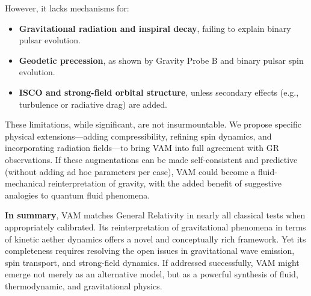 However, it lacks mechanisms for:

\begin{itemize}
    \item \textbf{Gravitational radiation and inspiral decay}, failing to explain binary pulsar evolution.
    \item \textbf{Geodetic precession}, as shown by Gravity Probe B and binary pulsar spin evolution.
    \item \textbf{ISCO and strong-field orbital structure}, unless secondary effects (e.g., turbulence or radiative drag) are added.
\end{itemize}

These limitations, while significant, are not insurmountable. We propose specific physical extensions—adding compressibility, refining spin dynamics, and incorporating radiation fields—to bring VAM into full agreement with GR observations. If these augmentations can be made self-consistent and predictive (without adding ad hoc parameters per case), VAM could become a fluid-mechanical reinterpretation of gravity, with the added benefit of suggestive analogies to quantum fluid phenomena.

\textbf{In summary}, VAM matches General Relativity in nearly all classical tests when appropriately calibrated. Its reinterpretation of gravitational phenomena in terms of kinetic aether dynamics offers a novel and conceptually rich framework. Yet its completeness requires resolving the open issues in gravitational wave emission, spin transport, and strong-field dynamics. If addressed successfully, VAM might emerge not merely as an alternative model, but as a powerful synthesis of fluid, thermodynamic, and gravitational physics.

